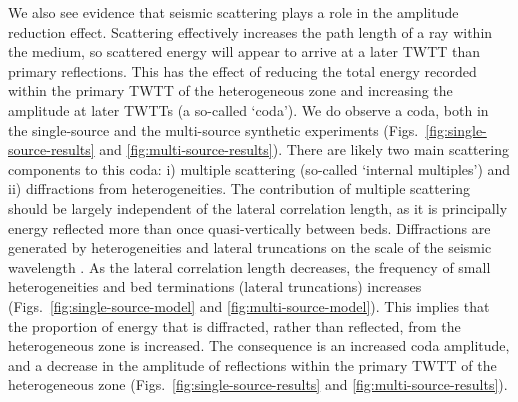 \documentclass[se,manuscript]{copernicus}
\begin{document}
We also see evidence that seismic scattering plays a role in the amplitude reduction effect.
Scattering effectively increases the path length of a ray within the medium, so scattered energy will appear to arrive at a later TWTT than primary reflections.
This has the effect of reducing the total energy recorded within the primary TWTT of the heterogeneous zone and increasing the amplitude at later TWTTs (a so-called `coda').
We do observe a coda, both in the single-source and the multi-source synthetic experiments (Figs.~\ref{fig:single-source-results} and \ref{fig:multi-source-results}).
There are likely two main scattering components to this coda: i) multiple scattering (so-called `internal multiples') and ii) diffractions from heterogeneities.
The contribution of multiple scattering should be largely independent of the lateral correlation length, as it is principally energy reflected more than once quasi-vertically between beds.
Diffractions are generated by heterogeneities and lateral truncations on the scale of the seismic wavelength \citep{schwarz_introduction_2019}.
As the lateral correlation length decreases, the frequency of small heterogeneities and bed terminations (lateral truncations) increases (Figs.~\ref{fig:single-source-model} and \ref{fig:multi-source-model}).
This implies that the proportion of energy that is diffracted, rather than reflected, from the heterogeneous zone is increased.
The consequence is an increased coda amplitude, and a decrease in the amplitude of reflections within the primary TWTT of the heterogeneous zone (Figs.~\ref{fig:single-source-results} and \ref{fig:multi-source-results}).
\end{document}
